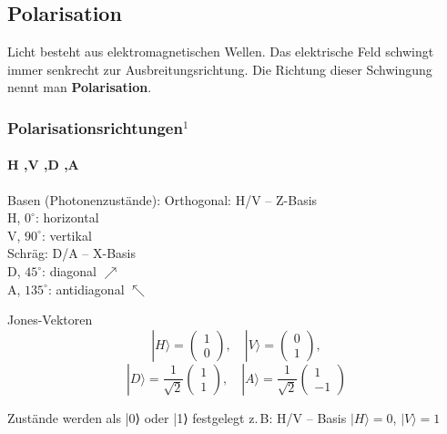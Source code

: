 \subsection{Polarisation}
\begin{frame}
	\begin{Definition}
		Licht besteht aus elektromagnetischen Wellen. Das elektrische Feld schwingt immer senkrecht zur Ausbreitungsrichtung. Die Richtung dieser Schwingung nennt man \textbf{Polarisation}.
	\end{Definition}
\end{frame}
\begin{frame}[allowframebreaks]
	\frametitle{Polarisationsrichtungen$^1$}
	\framesubtitle{H ,V ,D ,A}
	\begin{alertblock}{Basen (Photonenzust{\"a}nde):}
		Orthogonal: H/V – Z-Basis\\
			\hspace{0.5em}  H, $0^\circ$: horizontal \textrightarrow\\
			\hspace{0.5em}  V, $90^\circ$: vertikal  \textuparrow\\
		Schr{\"a}g: D/A – X-Basis\\
			\hspace{0.5em}  D, $45^\circ$: diagonal $\nearrow$\\
			\hspace{0.5em}  A, $135^\circ$: antidiagonal $\nwarrow$\\
	\end{alertblock}
	\begin{alertblock}{Jones-Vektoren}
		\[
		|H\rangle 
		= 
		\left(\begin{array}{c}
			1 \\ 0
		\end{array}\right),
		\quad
		|V\rangle 
		= 
		\left(\begin{array}{c}
			0 \\ 1
		\end{array}\right),
		\]
		\[
		|D\rangle 
		= \frac{1}{\sqrt{2}} 
		\left(\begin{array}{c}
		1 \\ 1
		\end{array}\right),
		\quad
		|A\rangle 
		= \frac{1}{\sqrt{2}} 
		\left(\begin{array}{c}
		1 \\ -1
		\end{array}\right)
		\]
	\end{alertblock}
	\begin{myExamples}{Zustände werden als |0⟩ oder |1⟩ festgelegt}
		z.\,B: H/V -- Basis \textrightarrow { }$|H\rangle = 0$, $|V\rangle = 1$
	\end{myExamples}
	
\end{frame}

